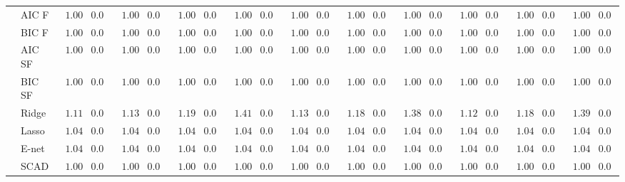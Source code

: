 \documentclass[12pt]{article}
\begin{document}
{\begin{landscape}
\begin{tabular}{ll|ll|llllll|llllll|llllll}
 & AIC F  & $\phantom{0}1.00$ & $0.04$ & $\phantom{0}1.00$ & $0.04$ & $\phantom{0}1.00$ & $0.04$ & $\phantom{0}1.00$ & $0.04$ & $\phantom{0}1.00$ & $0.04$ & $\phantom{0}1.00$ & $0.04$ & $\phantom{0}1.00$ & $0.04$ & $\phantom{0}1.00$ & $0.04$ & $\phantom{0}1.00$ & $0.04$ & $\phantom{0}1.00$ & $0.04$ \\
 & BIC F  & $\phantom{0}1.00$ & $0.04$ & $\phantom{0}1.00$ & $0.04$ & $\phantom{0}1.00$ & $0.04$ & $\phantom{0}1.00$ & $0.04$ & $\phantom{0}1.00$ & $0.04$ & $\phantom{0}1.00$ & $0.04$ & $\phantom{0}1.00$ & $0.04$ & $\phantom{0}1.00$ & $0.04$ & $\phantom{0}1.00$ & $0.04$ & $\phantom{0}1.00$ & $0.04$ \\
 & AIC SF  & $\phantom{0}1.00$ & $0.04$ & $\phantom{0}1.00$ & $0.04$ & $\phantom{0}1.00$ & $0.04$ & $\phantom{0}1.00$ & $0.04$ & $\phantom{0}1.00$ & $0.04$ & $\phantom{0}1.00$ & $0.04$ & $\phantom{0}1.00$ & $0.04$ & $\phantom{0}1.00$ & $0.04$ & $\phantom{0}1.00$ & $0.04$ & $\phantom{0}1.00$ & $0.04$ \\
 & BIC SF  & $\phantom{0}1.00$ & $0.04$ & $\phantom{0}1.00$ & $0.04$ & $\phantom{0}1.00$ & $0.04$ & $\phantom{0}1.00$ & $0.04$ & $\phantom{0}1.00$ & $0.04$ & $\phantom{0}1.00$ & $0.04$ & $\phantom{0}1.00$ & $0.04$ & $\phantom{0}1.00$ & $0.04$ & $\phantom{0}1.00$ & $0.04$ & $\phantom{0}1.00$ & $0.04$ \\
 & Ridge  & $\phantom{0}1.11$ & $0.05$ & $\phantom{0}1.13$ & $0.05$ & $\phantom{0}1.19$ & $0.05$ & $\phantom{0}1.41$ & $0.05$ & $\phantom{0}1.13$ & $0.05$ & $\phantom{0}1.18$ & $0.05$ & $\phantom{0}1.38$ & $0.05$ & $\phantom{0}1.12$ & $0.05$ & $\phantom{0}1.18$ & $0.05$ & $\phantom{0}1.39$ & $0.05$ \\
 & Lasso  & $\phantom{0}1.04$ & $0.05$ & $\phantom{0}1.04$ & $0.05$ & $\phantom{0}1.04$ & $0.05$ & $\phantom{0}1.04$ & $0.05$ & $\phantom{0}1.04$ & $0.05$ & $\phantom{0}1.04$ & $0.05$ & $\phantom{0}1.04$ & $0.05$ & $\phantom{0}1.04$ & $0.05$ & $\phantom{0}1.04$ & $0.05$ & $\phantom{0}1.04$ & $0.05$ \\
 & E-net  & $\phantom{0}1.04$ & $0.05$ & $\phantom{0}1.04$ & $0.05$ & $\phantom{0}1.04$ & $0.05$ & $\phantom{0}1.04$ & $0.05$ & $\phantom{0}1.04$ & $0.05$ & $\phantom{0}1.04$ & $0.05$ & $\phantom{0}1.04$ & $0.05$ & $\phantom{0}1.04$ & $0.05$ & $\phantom{0}1.04$ & $0.05$ & $\phantom{0}1.04$ & $0.05$ \\
 & SCAD  & $\phantom{0}1.00$ & $0.04$ & $\phantom{0}1.00$ & $0.04$ & $\phantom{0}1.00$ & $0.04$ & $\phantom{0}1.00$ & $0.04$ & $\phantom{0}1.00$ & $0.04$ & $\phantom{0}1.00$ & $0.04$ & $\phantom{0}1.00$ & $0.04$ & $\phantom{0}1.00$ & $0.04$ & $\phantom{0}1.00$ & $0.04$ & $\phantom{0}1.00$ & $0.04$ \\

\end{tabular}
\end{landscape}}
\end{document}
